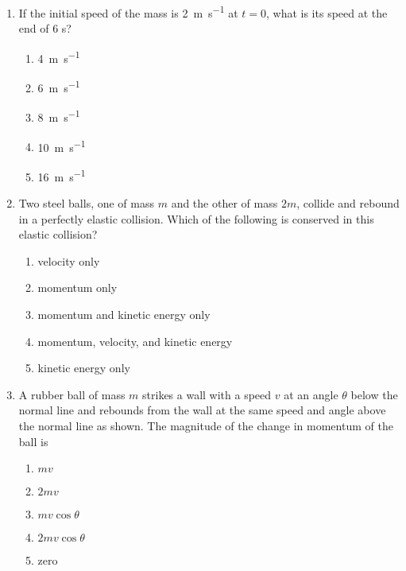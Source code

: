 \documentclass{../../../oss-apphys}
\begin{document}
\begin{multicols*}{2}
\begin{enumerate}[leftmargin=18pt,resume]
  \item If the initial speed of the mass is \SI{2}{\metre\per\second} at $t=0$,
    what is its speed at the end of 6 s?
    \label{impulse2}
    \begin{enumerate}[nosep,leftmargin=18pt,label=(\Alph*)]
    \item\SI{4}{\metre\per\second}
    \item\SI{6}{\metre\per\second}
    \item\SI{8}{\metre\per\second}
    \item\SI{10}{\metre\per\second}
    \item\SI{16}{\metre\per\second}
    \end{enumerate}
    \columnbreak
    
  \item Two steel balls, one of mass $m$ and the other of mass $2m$, collide and
    rebound in a perfectly elastic collision. Which of the following is
    conserved in this elastic collision?
    \begin{enumerate}[nosep,leftmargin=18pt,label=(\Alph*)]
    \item velocity only
    \item momentum only
    \item momentum and kinetic energy only
    \item momentum, velocity, and kinetic energy
    \item kinetic energy only
    \end{enumerate}
    \vspace{.8in}
    
  \item A rubber ball of mass $m$ strikes a wall with a speed $v$ at an angle
    $\theta$ below the normal line and rebounds from the wall at the same speed
    and angle above the normal line as shown. The magnitude of the change in
    momentum of the ball is
    \begin{center}
    \end{center}
    \begin{enumerate}[nosep,leftmargin=18pt,label=(\Alph*)]
    \item $mv$
    \item $2mv$
    \item $mv\cos\theta$
    \item $2mv\cos\theta$
    \item  zero
    \end{enumerate}
    \columnbreak
    

\end{enumerate}
\end{multicols*}
\end{document}
